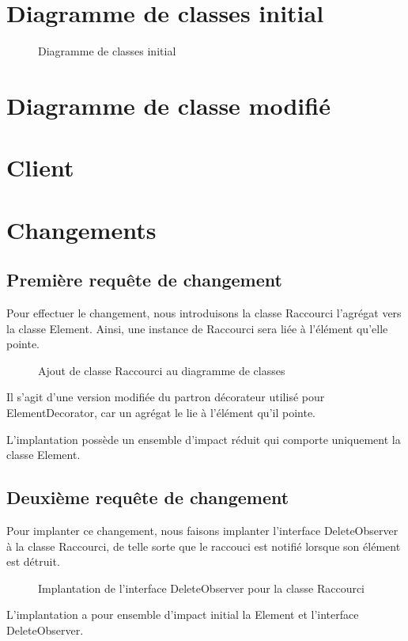 \documentclass{article}
\begin{document}
  \section{Diagramme de classes initial}
  \begin{sidewaysfigure}
  \centering
  \resizebox{\textwidth}{!}{}
  \caption{Diagramme de classes initial}
  \end{sidewaysfigure}

  \section{Diagramme de classe modifié}

  \section{Client}

  \section{Changements}

  \subsection{Première requête de changement}
  Pour effectuer le changement, nous introduisons la classe \textsf{Raccourci}
  l'agrégat vers la classe \textsf{Element}. Ainsi, une instance de
  \textsf{Raccourci} sera liée à l'élément qu'elle pointe.

  \begin{figure}
  \caption{Ajout de classe Raccourci au diagramme de classes}
  \end{figure}

  Il s'agit d'une version modifiée du partron décorateur utilisé pour
  \textsf{ElementDecorator}, car un agrégat le lie à l'élément qu'il pointe.

  L'implantation possède un ensemble d'impact réduit qui comporte uniquement la
  classe \textsf{Element}.

  \subsection{Deuxième requête de changement}
  Pour implanter ce changement, nous faisons implanter l'interface
  \textsf{DeleteObserver} à la classe \textsf{Raccourci}, de telle sorte que le
  raccouci est notifié lorsque son élément est détruit.

  \begin{figure}
  \caption{Implantation de l'interface DeleteObserver pour la classe Raccourci}
  \end{figure}

  L'implantation a pour ensemble d'impact initial la \textsf{Element} et
  l'interface \textsf{DeleteObserver}.
\end{document}
